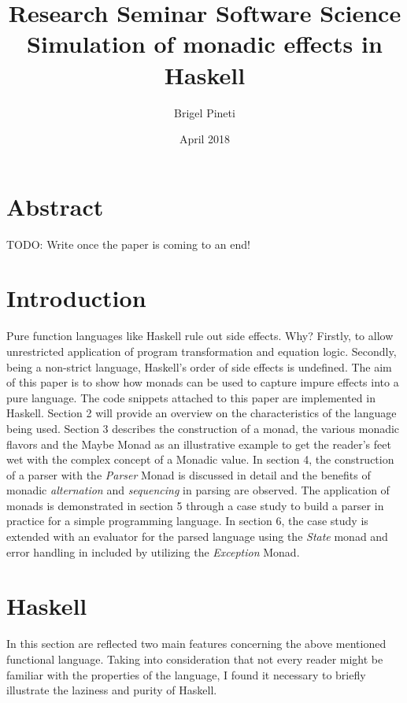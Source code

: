 \documentclass[a4paper, onecolumn]{article}
\title{\Large{Research Seminar Software Science} \\
    \huge{Simulation of monadic effects in Haskell}}
\author{Brigel Pineti}
\date{April 2018}
\begin{document}
    
    \maketitle
    
    \section*{Abstract}
    
    TODO: Write once the paper is coming to an end!
    
    \section{Introduction}
    
    Pure function languages like Haskell rule out side effects. Why? Firstly, to allow unrestricted application of program transformation and equation logic. Secondly, being a non-strict language, Haskell's order of side effects is undefined. The aim of this paper is to show how monads can be used to capture impure effects into a pure language. The code snippets attached to this paper are implemented in Haskell. Section 2 will provide an overview on the characteristics of the language being used. Section 3 describes the construction of a monad, the various monadic flavors and the Maybe Monad as an illustrative example to get the reader's feet wet with the complex concept of a Monadic value. In section 4, the construction of a parser with the \textit{Parser} Monad is discussed in detail and the benefits of monadic \textit{alternation} and \textit{sequencing} in parsing are observed. The application of monads is demonstrated in section 5 through a case study to build a parser in practice for a simple programming language. In section 6, the case study is extended with an evaluator for the parsed language using the \textit{State} monad and error handling in included by utilizing the \textit{Exception} Monad. 
    
    \section{Haskell}
    
    In this section are reflected two main features concerning the above mentioned functional language. Taking into consideration that not every reader might be familiar with the properties of the language, I found it necessary to briefly illustrate the laziness and purity of Haskell.  
    
\end{document}
